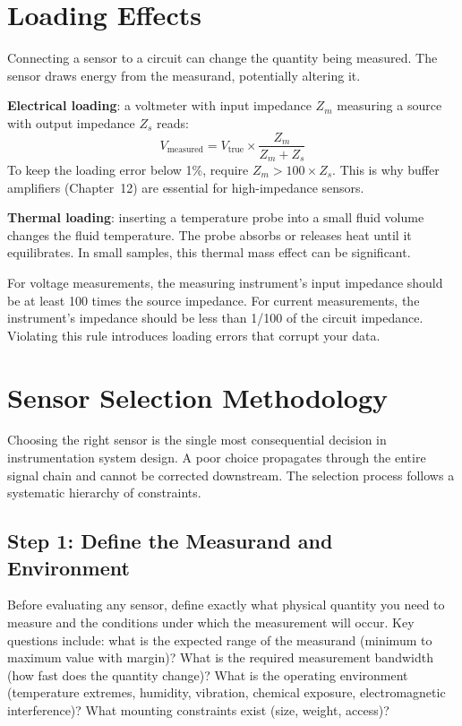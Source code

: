 \documentclass[11pt,letterpaper,twoside,openany]{book}
\begin{document}
\section{Loading Effects}
Connecting a sensor to a circuit can change the quantity being measured. The sensor draws energy from the measurand, potentially altering it.

\textbf{Electrical loading}: a voltmeter with input impedance $Z_m$ measuring a source with output impedance $Z_s$ reads:
\begin{equation}
V_{\text{measured}} = V_{\text{true}} \times \frac{Z_m}{Z_m + Z_s}
\end{equation}
To keep the loading error below 1\%, require $Z_m > 100 \times Z_s$. This is why buffer amplifiers (Chapter~12) are essential for high-impedance sensors.

\textbf{Thermal loading}: inserting a temperature probe into a small fluid volume changes the fluid temperature. The probe absorbs or releases heat until it equilibrates. In small samples, this thermal mass effect can be significant.

\begin{tipbox}
For voltage measurements, the measuring instrument's input impedance should be at least 100 times the source impedance. For current measurements, the instrument's impedance should be less than 1/100 of the circuit impedance. Violating this rule introduces loading errors that corrupt your data.
\end{tipbox}


\section{Sensor Selection Methodology}
Choosing the right sensor is the single most consequential decision in instrumentation system design. A poor choice propagates through the entire signal chain and cannot be corrected downstream. The selection process follows a systematic hierarchy of constraints.

\subsection{Step 1: Define the Measurand and Environment}
Before evaluating any sensor, define exactly what physical quantity you need to measure and the conditions under which the measurement will occur. Key questions include: what is the expected range of the measurand (minimum to maximum value with margin)? What is the required measurement bandwidth (how fast does the quantity change)? What is the operating environment (temperature extremes, humidity, vibration, chemical exposure, electromagnetic interference)? What mounting constraints exist (size, weight, access)?
\end{document}
